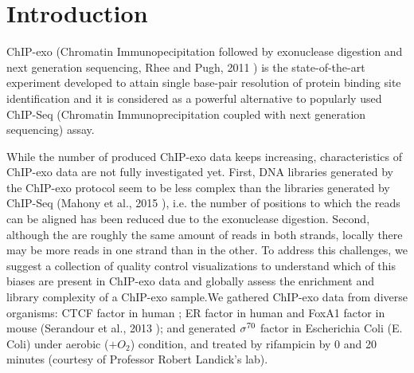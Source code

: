 \documentclass[11pt]{article}\usepackage[]{graphicx}\usepackage[]{color}
\begin{document}

\newpage

\section{Introduction}
\label{sec:intro}


ChIP-exo (Chromatin Immunopecipitation followed by exonuclease
digestion and next generation sequencing, Rhee and Pugh, 2011
\cite{exo1}) is the state-of-the-art experiment developed to attain
single base-pair resolution of protein binding site identification and
it is considered as a powerful alternative to popularly used ChIP-Seq
(Chromatin Immunoprecipitation coupled with next generation
sequencing) assay.

While the number of produced ChIP-exo data keeps increasing,
characteristics of ChIP-exo data are not fully investigated
yet. First, DNA libraries generated by the ChIP-exo protocol seem to
be less complex than the libraries generated by ChIP-Seq (Mahony et
al., 2015 \cite{exo_review}), i.e. the number of positions to which
the reads can be aligned has been reduced due to the exonuclease
digestion. Second, although the are roughly the same amount of reads
in both strands, locally there may be more reads in one strand than in
the other. To address this challenges, we suggest a collection of
quality control visualizations to understand which of this biases are
present in ChIP-exo data and globally assess the enrichment and
library complexity of a ChIP-exo sample.We gathered ChIP-exo data from
diverse organisms: CTCF factor in human \cite{exo1}; ER factor in
human and FoxA1 factor in mouse (Serandour et al., 2013
\cite{exoillumina}); and generated $\sigma^{70}$ factor in Escherichia Coli
(E. Coli) under aerobic ($ + O_2$) condition, and treated by
rifampicin by 0 and 20 minutes (courtesy of Professor Robert Landick's
lab).
\end{document}
